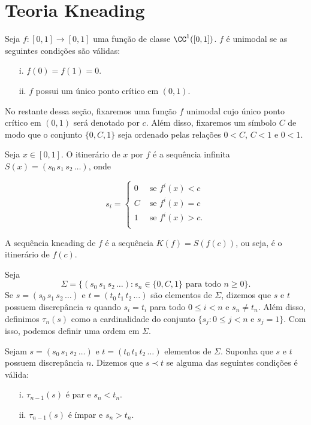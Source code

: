 \section{Teoria Kneading}

\begin{definition}
Seja $f: [0, 1] \to [0, 1]$ uma função de classe $\CC^1([0, 1])$. $f$ é unimodal se as seguintes condições são válidas:
\begin{enumerate}
\item[i.] $f(0) = f(1) = 0$.
\item[ii.] $f$ possui um único ponto crítico em $(0, 1)$.
\end{enumerate}
\end{definition}

No restante dessa seção, fixaremos uma função $f$ unimodal cujo único ponto crítico em $(0, 1)$ será denotado por $c$. Além disso, fixaremos um símbolo $C$ de modo que o conjunto $\{0, C, 1\}$ seja ordenado pelas relações $0 < C$, $C < 1$ e $0 < 1$.


\begin{definition}
Seja $x \in [0, 1]$. O itinerário de $x$ por $f$ é a sequência infinita $S(x) = (s_0 \, s_1 \, s_2 \, \dots)$, onde

\[ s_i = 
\begin{cases} 
  0 & \text{ se } f^i(x) < c \\
  C & \text{ se } f^i(x) = c \\
  1 & \text{ se } f^i(x) > c. \\
\end{cases}
\]
\end{definition}

\begin{definition}
A sequência kneading de $f$ é a sequência $K(f) = S(f(c))$, ou seja, é o itinerário de $f(c)$.
\end{definition}

Seja $$\Sigma = \{ (s_0\, s_1\, s_2\, \dots) : s_n \in \{0, C, 1\} \text{ para todo } n \geq 0\}.$$ Se $s = (s_0\, s_1\, s_2\, \dots)$ e $t = (t_0\, t_1\, t_2\, \dots)$ são elementos de $\Sigma$, dizemos que $s$ e $t$ possuem discrepância $n$ quando $s_i = t_i$ para todo $0 \leq i < n$ e $s_n \neq t_n$. Além disso, definimos $\tau_n(s)$ como a cardinalidade do conjunto $\{ s_j : 0 \leq j < n \text{ e } s_j = 1 \}$. Com isso, podemos definir uma ordem em $\Sigma$.

\begin{definition}
Sejam $s = (s_0\, s_1\, s_2\, \dots)$ e $t = (t_0\, t_1\, t_2\, \dots)$ elementos de $\Sigma$. Suponha que $s$ e $t$ possuem discrepância $n$. Dizemos que $s \prec t$ se alguma das seguintes condições é válida:
\begin{enumerate}
\item[i.] $\tau_{n-1}(s)$ é par e $s_n < t_n$.
\item[ii.] $\tau_{n-1}(s)$ é ímpar e $s_n > t_n$.
\end{enumerate}
\end{definition}

